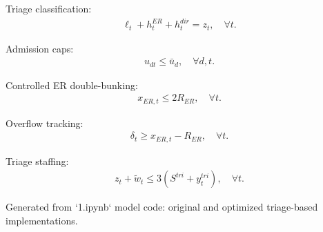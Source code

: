 \documentclass[11pt]{article}
\begin{document}
Triage classification:
\begin{align}
\ell_t + h_t^{ER} + h_t^{dir} = z_t, \quad \forall t.
\end{align}

Admission caps:
\begin{align}
u_{dt} \le \bar{u}_d, \quad \forall d,t.
\end{align}

Controlled ER double-bunking:
\begin{align}
x_{ER,t} \le 2R_{ER}, \quad \forall t.
\end{align}

Overflow tracking:
\begin{align}
\delta_t \ge x_{ER,t} - R_{ER}, \quad \forall t.
\end{align}

Triage staffing:
\begin{align}
z_t + \tilde{w}_t \le 3 (S^{tri} + y_t^{tri}), \quad \forall t.
\end{align}

\vspace{6pt}
\noindent Generated from `1.ipynb` model code: original and optimized triage-based implementations.
\end{document}
